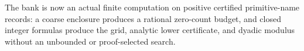 The bank is now an actual finite computation on positive certified primitive-name records: a coarse enclosure produces a rational zero-count budget, and closed integer formulas produce the grid, analytic lower certificate, and dyadic modulus without an unbounded or proof-selected search.